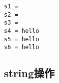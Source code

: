 \begin{tcolorbox}
	\begin{verbatim}
s1 = 
s2 =
s3 =
s4 = hello
s5 = hello
s6 = hello
	\end{verbatim}
\end{tcolorbox}

\subsection{string操作}

